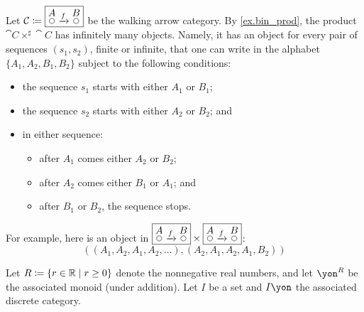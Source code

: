 \documentclass[Book-Poly]{subfiles}
\begin{document}
\begin{example}\label{ex.unexpectedly_many_objects}
Let $\cat{C}\coloneqq\fbox{$\LMO{A}\To{f}\LMO{B}$}$ be the walking arrow category. By \cref{ex.bin_prod}, the product $\cat{C}\times^\sharp\cat{C}$ has infinitely many objects. Namely, it has an object for every pair of sequences $(s_1, s_2)$, finite or infinite, that one can write in the alphabet $\{A_1, A_2, B_1, B_2\}$ subject to the following conditions:
\begin{itemize}
    \item the sequence $s_1$ starts with either $A_1$ or $B_1$;
    \item the sequence $s_2$ starts with either $A_2$ or $B_2$; and
	\item in either sequence:
	\begin{itemize}
	    \item after $A_1$ comes either $A_2$ or $B_2$;
	    \item after $A_2$ comes either $B_1$ or $A_1$; and
	    \item after $B_1$ or $B_2$, the sequence stops.
	\end{itemize}
\end{itemize}
For example, here is an object in $\fbox{$\LMO{A}\To{f}\LMO{B}$}\times\fbox{$\LMO{A}\To{f}\LMO{B}$}$:
\[
((A_1,A_2,A_1,A_2,\ldots), (A_2,A_1,A_2,A_1,B_2))
\]
\end{example}


\begin{example}
Let $R\coloneqq\{r\in\mathbb{R}\mid r\geq 0\}$ denote the nonnegative real numbers, and let $\yon^R$ be the associated monoid (under addition). Let $I$ be a set and $I\yon$ the associated discrete category.

\end{example}
\end{document}
